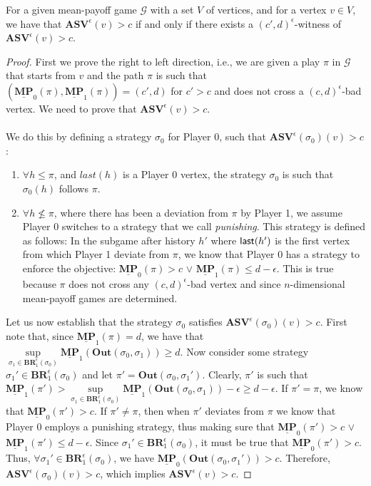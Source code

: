 \begin{theorem}
\label{ThmWitnessASVInfMem}
For a given mean-payoff game $\mathcal{G}$ with a set $V$ of vertices, and for a vertex $v \in V$, we have that $\mathbf{ASV}^{\epsilon}(v) > c$ if and only if there exists a 
$(c',d)^{\epsilon}$-witness of $\mathbf{ASV}^{\epsilon}(v) > c$.
\end{theorem}
\begin{proof}
First we prove the right to left direction, i.e., we are given a play $\pi$ in $\mathcal{G}$ that starts from $v$   and the path $\pi$ is such that $(\underline{\mathbf{MP}}_0(\pi), \underline{\mathbf{MP}}_1(\pi)) = (c', d)$ for $c' > c$ and does not cross a $(c,d)^{\epsilon}$-bad vertex. We need to prove that $\mathbf{ASV}^{\epsilon}(v) > c$.
\\
\\
We do this by defining a strategy $\sigma_0$ for Player 0, such that $\mathbf{ASV}^{\epsilon}(\sigma_0)(v) > c$:
\begin{enumerate}
    \item $\forall h \leqslant \pi$, and $last(h)$ is a Player 0 vertex, the strategy $\sigma_0$ is such that $\sigma_0(h)$ follows $\pi$.
    \item $\forall h \nleqslant \pi$, where there has been a deviation from $\pi$ by Player 1, we assume Player 0 switches to a strategy that we call \textit{punishing}. This strategy is defined as follows: In the subgame after history $h'$ where ${\sf last}(h')$ is the first vertex from which Player 1 deviate from $\pi$, we know that Player 0 has a strategy to enforce the objective: $\underline{\mathbf{MP}}_0(\pi) > c$ $\lor$ $ \underline{\mathbf{MP}}_1(\pi) \leqslant d-\epsilon$. This is true because $\pi$ does not cross any $(c,d)^{\epsilon}$-bad vertex and since $n$-dimensional mean-payoff games are determined.
\end{enumerate}

Let us now establish that the strategy $\sigma_0$ satisfies $\mathbf{ASV}^{\epsilon}(\sigma_0)(v) > c$. 
First note that, since $\underline{\mathbf{MP}}_1(\pi) = d$, we have that $\sup\limits_{\sigma_1 \in \mathbf{BR}_1^{\epsilon}(\sigma_0)} \underline{\mathbf{MP}}_1(\mathbf{Out}(\sigma_0, \sigma_1)) \geqslant d$. Now consider some strategy $\sigma_1' \in \mathbf{BR}_1^{\epsilon}(\sigma_0)$ and let $\pi' = \mathbf{Out}(\sigma_0, \sigma_1')$. Clearly, $\pi'$ is such that $\underline{\mathbf{MP}}_1(\pi') > \sup\limits_{\sigma_1 \in \mathbf{BR}_1^{\epsilon}(\sigma_0)} \underline{\mathbf{MP}}_1(\mathbf{Out}(\sigma_0, \sigma_1)) -\epsilon \geqslant d-\epsilon$. If $\pi' = \pi$, we know that $\underline{\mathbf{MP}}_0(\pi') > c$. If $\pi' \neq \pi$, then when $\pi'$ deviates from $\pi$ we know that Player 0 employs a punishing strategy, thus making sure that $\underline{\mathbf{MP}}_0(\pi') > c$ $\lor$ $ \underline{\mathbf{MP}}_1(\pi') \leqslant d-\epsilon$. Since $\sigma_1' \in \mathbf{BR}_1^{\epsilon}(\sigma_0)$, it must be true that $\underline{\mathbf{MP}}_0(\pi') > c$. Thus, $\forall \sigma_1' \in \mathbf{BR}_1^{\epsilon}(\sigma_0)$, we have $\underline{\mathbf{MP}}_0(\mathbf{Out}(\sigma_0, \sigma_1')) > c$. Therefore, $\mathbf{ASV}^{\epsilon}(\sigma_0)(v) > c$, which implies $\mathbf{ASV}^{\epsilon}(v) > c$.


\end{proof}
